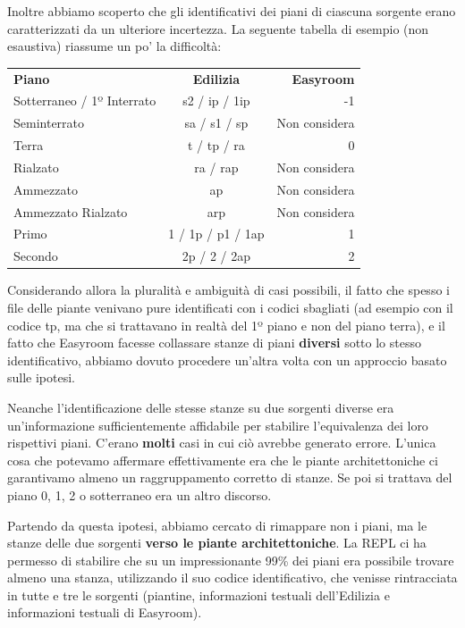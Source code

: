 \documentclass[12pt]{report}
\begin{document}
Inoltre abbiamo scoperto che gli identificativi dei piani di ciascuna sorgente
erano caratterizzati da un ulteriore incertezza. La seguente 
tabella di esempio (non esaustiva) riassume un po' la difficoltà:

\vspace{1cm}
\begin{tabular}{ l c r }
  \hline
  \textbf{Piano}              & \textbf{Edilizia} & \textbf{Easyroom}    \\
  Sotterraneo / 1º Interrato  & s2 / ip / 1ip     & -1                   \\
  Seminterrato                & sa / s1 / sp      & Non considera        \\
  Terra                       & t / tp / ra       & 0                    \\
  Rialzato                    & ra / rap          & Non considera        \\
  Ammezzato                   & ap                & Non considera        \\
  Ammezzato Rialzato          & arp               & Non considera        \\
  Primo                       & 1 / 1p / p1 / 1ap & 1                    \\
  Secondo                     & 2p / 2 / 2ap      & 2                    \\
  \hline
\end{tabular}
\vspace{1cm}

Considerando allora la pluralità e ambiguità di casi possibili,
il fatto che spesso i file delle piante venivano pure identificati 
con i codici sbagliati (ad esempio con il codice tp,
ma che si trattavano in realtà del 1º piano e non del piano terra), 
e il fatto che Easyroom facesse collassare stanze di piani 
\textbf{diversi} sotto lo stesso identificativo, abbiamo dovuto 
procedere un'altra volta con un approccio basato sulle ipotesi.

Neanche l'identificazione delle stesse stanze su due sorgenti diverse
era un'informazione sufficientemente affidabile per stabilire l'equivalenza
dei loro rispettivi piani. C'erano \textbf{molti} casi in cui ciò 
avrebbe generato errore. L'unica cosa che potevamo affermare effettivamente
era che le piante architettoniche ci garantivamo almeno un raggruppamento
corretto di stanze. Se poi si trattava del piano 0, 1, 2 o sotterraneo
era un altro discorso.

Partendo da questa ipotesi, abbiamo cercato di rimappare non i piani, ma 
le stanze delle due sorgenti \textbf{verso le piante architettoniche}.
La REPL ci ha permesso di stabilire che su un impressionante
99\% dei piani era possibile trovare almeno una stanza, utilizzando il
suo codice identificativo, che venisse rintracciata in tutte e tre le
sorgenti (piantine, informazioni testuali dell'Edilizia e informazioni
testuali di Easyroom). 
\end{document}
